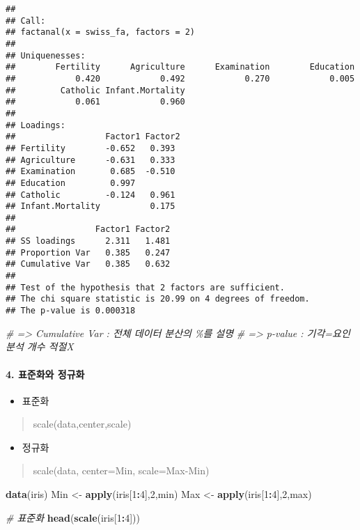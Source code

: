 \documentclass[
]{article}
\newenvironment{Shaded}{\begin{snugshade}}{\end{snugshade}}
\newcommand{\CommentTok}[1]{\textcolor[rgb]{0.56,0.35,0.01}{\textit{#1}}}
\newcommand{\DecValTok}[1]{\textcolor[rgb]{0.00,0.00,0.81}{#1}}
\newcommand{\FunctionTok}[1]{\textcolor[rgb]{0.13,0.29,0.53}{\textbf{#1}}}
\newcommand{\NormalTok}[1]{#1}
\newcommand{\OtherTok}[1]{\textcolor[rgb]{0.56,0.35,0.01}{#1}}
\newcommand{\SpecialCharTok}[1]{\textcolor[rgb]{0.81,0.36,0.00}{\textbf{#1}}}
\providecommand{\tightlist}{%
  \setlength{\itemsep}{0pt}\setlength{\parskip}{0pt}}
\begin{document}
\begin{verbatim}
## 
## Call:
## factanal(x = swiss_fa, factors = 2)
## 
## Uniquenesses:
##        Fertility      Agriculture      Examination        Education 
##            0.420            0.492            0.270            0.005 
##         Catholic Infant.Mortality 
##            0.061            0.960 
## 
## Loadings:
##                  Factor1 Factor2
## Fertility        -0.652   0.393 
## Agriculture      -0.631   0.333 
## Examination       0.685  -0.510 
## Education         0.997         
## Catholic         -0.124   0.961 
## Infant.Mortality          0.175 
## 
##                Factor1 Factor2
## SS loadings      2.311   1.481
## Proportion Var   0.385   0.247
## Cumulative Var   0.385   0.632
## 
## Test of the hypothesis that 2 factors are sufficient.
## The chi square statistic is 20.99 on 4 degrees of freedom.
## The p-value is 0.000318
\end{verbatim}

\begin{Shaded}
\begin{Highlighting}[]
\CommentTok{\# =\textgreater{} Cumulative Var : 전체 데이터 분산의 \%를 설명}
\CommentTok{\# =\textgreater{} p{-}value : 기각=요인 분석 개수 적절X}
\end{Highlighting}
\end{Shaded}

\hypertarget{uxd45cuxc900uxd654uxc640-uxc815uxaddcuxd654}{%
\paragraph{4. 표준화와
정규화}\label{uxd45cuxc900uxd654uxc640-uxc815uxaddcuxd654}}

\begin{itemize}
\tightlist
\item
  표준화
\end{itemize}

\begin{quote}
scale(data,center,scale)
\end{quote}

\begin{itemize}
\tightlist
\item
  정규화
\end{itemize}

\begin{quote}
scale(data, center=Min, scale=Max-Min)
\end{quote}

\begin{Shaded}
\begin{Highlighting}[]
\FunctionTok{data}\NormalTok{(iris)}
\NormalTok{Min }\OtherTok{\textless{}{-}} \FunctionTok{apply}\NormalTok{(iris[}\DecValTok{1}\SpecialCharTok{:}\DecValTok{4}\NormalTok{],}\DecValTok{2}\NormalTok{,min)}
\NormalTok{Max }\OtherTok{\textless{}{-}} \FunctionTok{apply}\NormalTok{(iris[}\DecValTok{1}\SpecialCharTok{:}\DecValTok{4}\NormalTok{],}\DecValTok{2}\NormalTok{,max)}

\CommentTok{\# 표준화}
\FunctionTok{head}\NormalTok{(}\FunctionTok{scale}\NormalTok{(iris[}\DecValTok{1}\SpecialCharTok{:}\DecValTok{4}\NormalTok{]))}
\end{Highlighting}
\end{Shaded}
\end{document}
